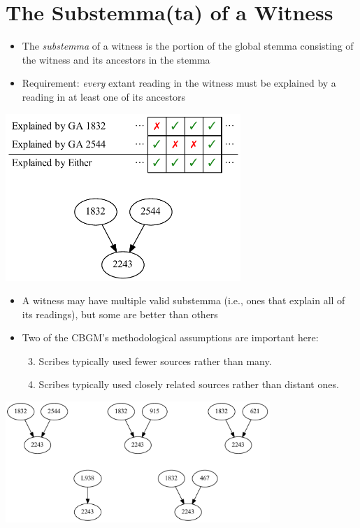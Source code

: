 \documentclass[10pt]{beamer}
\begin{document}
	\section*{The Substemma(ta) of a Witness}
	\begin{frame}
		\begin{itemize}
			\item The \emph{substemma} of a witness is the portion of the global stemma consisting of the witness and its ancestors in the stemma
			\item Requirement: \emph{every} extant reading in the witness must be explained by a reading in at least one of its ancestors
		\end{itemize}
		\begin{center}
			\includegraphics[width=0.6667\textwidth]{../img/ga-2243-substemma.pdf}
		\end{center}
	\end{frame}
	\begin{frame}
		\begin{itemize}
			\item A witness may have multiple valid substemma (i.e., ones that explain all of its readings), but some are better than others
			\item Two of the CBGM's methodological assumptions are important here:
			\begin{enumerate}
				\setcounter{enumi}{2} %
				\item Scribes typically used fewer sources rather than many.
				\item Scribes typically used closely related sources rather than distant ones.
			\end{enumerate}
		\end{itemize}
		\begin{center}
			\includegraphics[width=0.75\textwidth]{../img/substemmata.pdf}
		\end{center}
	\end{frame}
\end{document}
